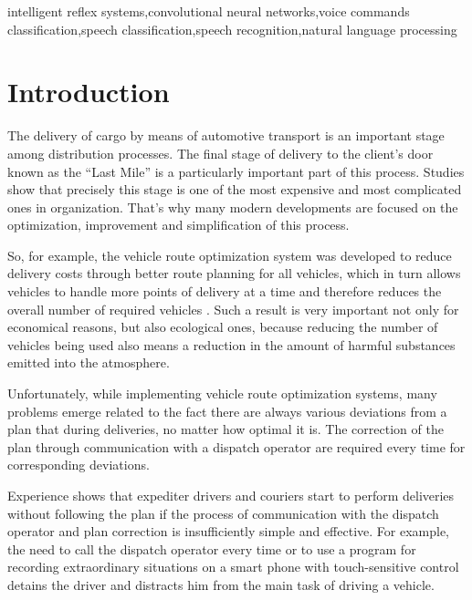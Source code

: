 \documentclass[review,authoryear]{elsarticle}
\begin{document}
\begin{frontmatter}
	\begin{keyword}
		intelligent reflex systems\sep convolutional neural networks\sep voice commands classification\sep speech classification\sep speech recognition\sep natural language processing
	\end{keyword}
	
	
\end{frontmatter}

\section{Introduction}

The delivery of cargo by means of automotive transport is an important stage among distribution processes. The final stage of delivery to the client’s door known as the “Last Mile” is a particularly important part of this process. Studies show that precisely this stage is one of the most expensive and most complicated ones in organization. That’s why many modern developments are focused on the optimization, improvement and simplification of this process.

So, for example, the vehicle route optimization system was developed to reduce delivery costs through better route planning for all vehicles, which in turn allows vehicles to handle more points of delivery at a time and therefore reduces the overall number of required vehicles \citep{eng_art1}. Such a result is very important not only for economical reasons, but also ecological ones, because reducing the number of vehicles being used also means a reduction in the amount of harmful substances emitted into the atmosphere.

Unfortunately, while implementing vehicle route optimization systems, many problems emerge related to the fact there are always various deviations from a plan that during deliveries, no matter how optimal it is. The correction of the plan through communication with a dispatch operator are required every time for corresponding deviations.

Experience shows that expediter drivers and couriers start to perform deliveries without following the plan if the process of communication with the dispatch operator and plan correction is insufficiently simple and effective. For example, the need to call the dispatch operator every time or to use a program for recording extraordinary situations on a smart phone with touch-sensitive control detains the driver and distracts him from the main task of driving a vehicle.
\end{document}
